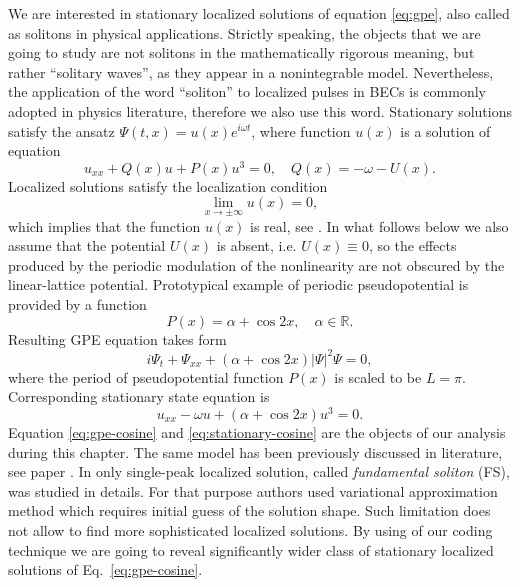 We are interested in stationary localized solutions of equation \eqref{eq:gpe}, also called as solitons in physical applications.
Strictly speaking, the objects that we are going to study are not solitons in the mathematically rigorous meaning, but rather ``solitary waves'', as they appear in a nonintegrable model.
Nevertheless, the application of the word ``soliton'' to localized pulses in BECs is commonly adopted in physics literature, therefore we also use this word.
Stationary solutions satisfy the ansatz $\Psi(t, x) = u(x) e^{i \omega t}$, where function $u(x)$ is a solution of equation
\begin{equation}
	u_{xx} + Q(x) u + P(x) u^3 = 0, \quad Q(x) = -\omega - U(x).
\end{equation}
Localized solutions satisfy the localization condition
\begin{equation}
	\lim \limits_{x \to \pm \infty} u(x) = 0,
\label{eq:localization}
\end{equation}
which implies that the function $u(x)$ is real, see \cite{AlfimovKonotopSalerno}.
In what follows below we also assume that the potential $U(x)$ is absent, i.e. $U(x) \equiv 0$, so the effects produced by the periodic modulation of the nonlinearity are not obscured by the linear-lattice potential.
Prototypical example of periodic pseudopotential is provided by a function
\begin{equation}
	P(x) = \alpha + \cos 2x, \quad \alpha \in \mathbb{R}.
\label{eq:cosine-pseudopotential}
\end{equation}
Resulting GPE equation takes form
\begin{equation}
	i \Psi_t + \Psi_{xx} + (\alpha + \cos 2x) |\Psi|^2 \Psi = 0,
\label{eq:gpe-cosine}
\end{equation}
where the period of pseudopotential function $P(x)$ is scaled to be $L = \pi$.
Corresponding stationary state equation is
\begin{equation}
	u_{xx} - \omega u + (\alpha + \cos 2x) u^3 = 0.
\label{eq:stationary-cosine}
\end{equation}
Equation \eqref{eq:gpe-cosine} and \eqref{eq:stationary-cosine} are the objects of our analysis during this chapter.
The same model has been previously discussed in literature, see paper \cite{SakaguchiMalomed}.
In \cite{SakaguchiMalomed} only single-peak localized solution, called {\it fundamental soliton} (FS), was studied in details.
For that purpose authors used variational approximation method which requires initial guess of the solution shape.
Such limitation does not allow to find more sophisticated localized solutions.
By using of our coding technique we are going to reveal significantly wider class of stationary localized solutions of Eq.~\eqref{eq:gpe-cosine}.

